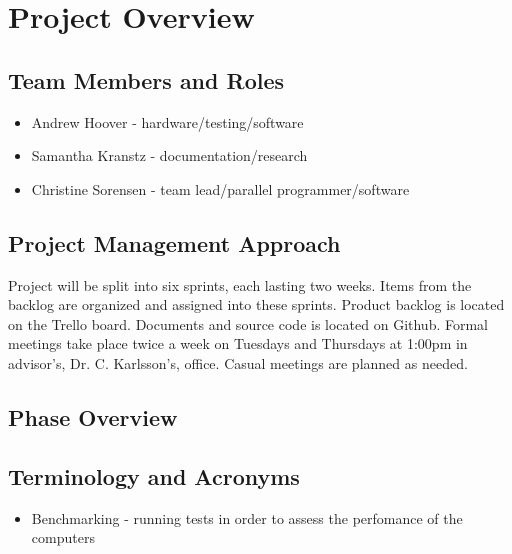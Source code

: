 

\chapter{Project Overview}



\section{Team Members and Roles}
\begin{itemize}
	\item Andrew Hoover - hardware/testing/software
	\item Samantha Kranstz - documentation/research
	\item Christine Sorensen - team lead/parallel programmer/software
\end{itemize}

\section{Project  Management Approach}
Project will be split into six sprints, each lasting two weeks. Items from the backlog are organized and assigned into these sprints. \newline \newline Product backlog is located on the Trello board. Documents and source code is located on Github. \newline \newline Formal meetings take place twice a week on Tuesdays and Thursdays at 1:00pm in advisor's, Dr. C. Karlsson's, office. Casual meetings are planned as needed.

\section{Phase  Overview}



\section{Terminology and Acronyms}
\begin{itemize}
	\item Benchmarking - running tests in order to assess the perfomance of the computers
\end{itemize}


